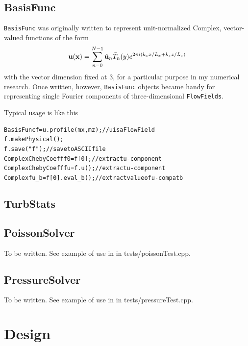 \documentclass{article}[12pt]
\begin{document}
\subsection{BasisFunc}
\label{sec:basisfunc}

{\tt BasisFunc} was originally written to represent unit-normalized Complex,
vector-valued functions of the form
\begin{align}
{\bf u}({\bf x}) = \sum_{n=0}^{N-1} \hat{{\bf u}}_n \bar{T}_n(y)  e^{2 \pi i (k_x x/L_x + k_z z/L_z)}
\label{eqn:bassisfunc}
\end{align}
with the vector dimension fixed at 3, for a particular purpose in my
numerical research. Once written, however, {\tt BasisFunc} objects
became handy for representing single Fourier components of three-dimensional
{\tt FlowFields}.

Typical usage is like this
\begin{alltt}
  BasisFunc f = u.profile(mx,mz);     // u is a FlowField
  f.makePhysical();
  f.save("f");                        // save to ASCII file
  ComplexChebyCoeff f0 = f[0];        // extract u-component
  ComplexChebyCoeff fu = f.u();       // extract u-component
  Complex fu_b = f[0].eval_b();       // extract value of u-comp at b
\end{alltt}


\subsection{TurbStats}
\label{sec:turbstats}

\subsection{PoissonSolver}
\label{sec:poissonsolver}

To be written. See example of use in in tests/poissonTest.cpp.

\subsection{PressureSolver}
\label{sec:pressuresolver}

To be written. See example of use in in tests/pressureTest.cpp.

\section{Design}
\end{document}
